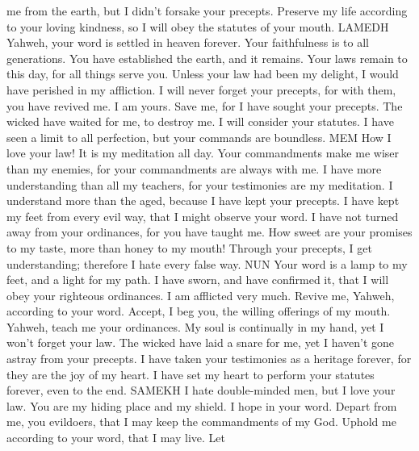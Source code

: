 me from the earth, but I didn't forsake your precepts. 
Preserve my life according to your loving kindness, so I will obey the
statutes of your mouth. LAMEDH  Yahweh, your word is
settled in heaven forever.  Your faithfulness is to all
generations. You have established the earth, and it remains.
 Your laws remain to this day, for all things serve you.
 Unless your law had been my delight, I would have
perished in my affliction.  I will never forget your
precepts, for with them, you have revived me.  I am
yours. Save me, for I have sought your precepts.  The
wicked have waited for me, to destroy me. I will consider your statutes.
 I have seen a limit to all perfection, but your commands
are boundless. MEM  How I love your law! It is my
meditation all day.  Your commandments make me wiser than
my enemies, for your commandments are always with me.  I
have more understanding than all my teachers, for your testimonies are
my meditation.  I understand more than the aged, because
I have kept your precepts.  I have kept my feet from
every evil way, that I might observe your word.  I have
not turned away from your ordinances, for you have taught me.
 How sweet are your promises to my taste, more than
honey to my mouth!  Through your precepts, I get
understanding; therefore I hate every false way. NUN 
Your word is a lamp to my feet, and a light for my path.
 I have sworn, and have confirmed it, that I will obey
your righteous ordinances.  I am afflicted very much.
Revive me, Yahweh, according to your word.  Accept, I
beg you, the willing offerings of my mouth. Yahweh, teach me your
ordinances.  My soul is continually in my hand, yet I
won't forget your law.  The wicked have laid a snare for
me, yet I haven't gone astray from your precepts.  I
have taken your testimonies as a heritage forever, for they are the joy
of my heart.  I have set my heart to perform your
statutes forever, even to the end. SAMEKH  I hate
double-minded men, but I love your law.  You are my
hiding place and my shield. I hope in your word.  Depart
from me, you evildoers, that I may keep the commandments of my God.
 Uphold me according to your word, that I may live. Let
